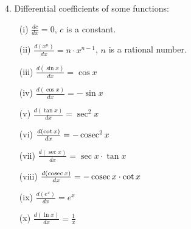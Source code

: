 4. Differential coefficients of some functions:
   \begin{itemize}
   \item[(i)] $\frac{dc}{dx} = 0$, $c$ is a constant.
   \item[(ii)] $\frac{d(x^n)}{dx} = n \cdot x^{n-1}$, $n$ is a rational number.
   \item[(iii)] $\frac{d(\sin x)}{dx} = \cos x$
   \item[(iv)] $\frac{d(\cos x)}{dx} = -\sin x$
   \item[(v)] $\frac{d(\tan x)}{dx} = \sec^2 x$
   \item[(vi)] $\frac{d(\cot x)}{dx} = -\operatorname{cosec}^2 x$
   \item[(vii)] $\frac{d(\sec x)}{dx} = \sec x \cdot \tan x$
   \item[(viii)] $\frac{d(\operatorname{cosec} x)}{dx} = -\operatorname{cosec} x \cdot \cot x$
   \item[(ix)] $\frac{d(e^x)}{dx} = e^x$
   \item[(x)] $\frac{d(\ln x)}{dx} = \frac{1}{x}$
   \end{itemize}
   

